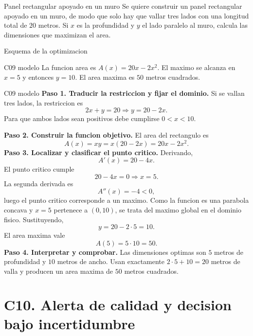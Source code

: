 \begin{contextproblem}{Panel rectangular apoyado en un muro}
Se quiere construir un panel rectangular apoyado en un muro, de modo que solo hay que vallar
tres lados con una longitud total de \(20\) metros. Si \(x\) es la profundidad y \(y\) el lado
paralelo al muro, calcula las dimensiones que maximizan el area.
\end{contextproblem}

\begin{databox}{Esquema de la optimizacion}
\begin{center}
\end{center}
\end{databox}

\begin{shortanswer}{C09 modelo}
La funcion area es \(A(x)=20x-2x^2\). El maximo se alcanza en \(x=5\) y entonces \(y=10\).
El area maxima es \(50\) metros cuadrados.
\end{shortanswer}

\begin{fullsolution}{C09 modelo}
\textbf{Paso 1. Traducir la restriccion y fijar el dominio.}
Si se vallan tres lados, la restriccion es
\[
2x+y=20 \Longrightarrow y=20-2x.
\]
Para que ambos lados sean positivos debe cumplirse \(0<x<10\).

\textbf{Paso 2. Construir la funcion objetivo.}
El area del rectangulo es
\[
A(x)=xy=x(20-2x)=20x-2x^2.
\]
\textbf{Paso 3. Localizar y clasificar el punto critico.}
Derivando,
\[
A'(x)=20-4x.
\]
El punto critico cumple
\[
20-4x=0 \Longrightarrow x=5.
\]
La segunda derivada es
\[
A''(x)=-4<0,
\]
luego el punto critico corresponde a un maximo. Como la funcion es una parabola concava y
\(x=5\) pertenece a \((0,10)\), se trata del maximo global en el dominio fisico. Sustituyendo,
\[
y=20-2\cdot 5=10.
\]
El area maxima vale
\[
A(5)=5\cdot 10=50.
\]
\textbf{Paso 4. Interpretar y comprobar.} Las dimensiones optimas son \(5\) metros de
profundidad y \(10\) metros de ancho. Usan exactamente \(2\cdot5+10=20\) metros de valla y
producen un area maxima de \(50\) metros cuadrados.
\end{fullsolution}

\section{C10. Alerta de calidad y decision bajo incertidumbre}

